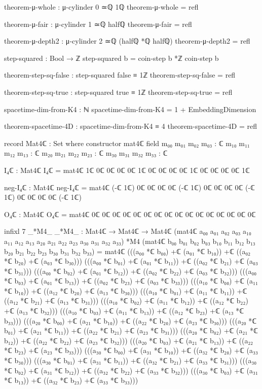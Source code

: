 \documentclass[11pt,a4paper]{book}
\begin{document}
\begin{code}
theorem-μ-whole : μ-cylinder 0 ≃ℚ 1ℚ
theorem-μ-whole = refl

theorem-μ-fair : μ-cylinder 1 ≃ℚ halfℚ
theorem-μ-fair = refl

theorem-μ-depth2 : μ-cylinder 2 ≃ℚ (halfℚ *ℚ halfℚ)
theorem-μ-depth2 = refl

step-squared : Bool → ℤ
step-squared b = coin-step b *ℤ coin-step b

theorem-step-sq-false : step-squared false ≡ 1ℤ
theorem-step-sq-false = refl

theorem-step-sq-true : step-squared true ≡ 1ℤ
theorem-step-sq-true = refl

spacetime-dim-from-K4 : ℕ
spacetime-dim-from-K4 = 1 + EmbeddingDimension

theorem-spacetime-4D : spacetime-dim-from-K4 ≡ 4
theorem-spacetime-4D = refl

record Mat4ℂ : Set where
  constructor mat4ℂ
  field
    m₀₀ m₀₁ m₀₂ m₀₃ : ℂ
    m₁₀ m₁₁ m₁₂ m₁₃ : ℂ
    m₂₀ m₂₁ m₂₂ m₂₃ : ℂ
    m₃₀ m₃₁ m₃₂ m₃₃ : ℂ

I₄ℂ : Mat4ℂ
I₄ℂ = mat4ℂ 1ℂ 0ℂ 0ℂ 0ℂ  0ℂ 1ℂ 0ℂ 0ℂ  0ℂ 0ℂ 1ℂ 0ℂ  0ℂ 0ℂ 0ℂ 1ℂ

neg-I₄ℂ : Mat4ℂ
neg-I₄ℂ = mat4ℂ (-ℂ 1ℂ) 0ℂ 0ℂ 0ℂ  0ℂ (-ℂ 1ℂ) 0ℂ 0ℂ
                 0ℂ 0ℂ (-ℂ 1ℂ) 0ℂ  0ℂ 0ℂ 0ℂ (-ℂ 1ℂ)

O₄ℂ : Mat4ℂ
O₄ℂ = mat4ℂ 0ℂ 0ℂ 0ℂ 0ℂ  0ℂ 0ℂ 0ℂ 0ℂ  0ℂ 0ℂ 0ℂ 0ℂ  0ℂ 0ℂ 0ℂ 0ℂ

infixl 7 _*M4_
_*M4_ : Mat4ℂ → Mat4ℂ → Mat4ℂ
(mat4ℂ a₀₀ a₀₁ a₀₂ a₀₃ a₁₀ a₁₁ a₁₂ a₁₃
       a₂₀ a₂₁ a₂₂ a₂₃ a₃₀ a₃₁ a₃₂ a₃₃) *M4
 (mat4ℂ b₀₀ b₀₁ b₀₂ b₀₃ b₁₀ b₁₁ b₁₂ b₁₃
        b₂₀ b₂₁ b₂₂ b₂₃ b₃₀ b₃₁ b₃₂ b₃₃) =
  mat4ℂ
   (((a₀₀ *ℂ b₀₀) +ℂ (a₀₁ *ℂ b₁₀)) +ℂ ((a₀₂ *ℂ b₂₀) +ℂ (a₀₃ *ℂ b₃₀)))
   (((a₀₀ *ℂ b₀₁) +ℂ (a₀₁ *ℂ b₁₁)) +ℂ ((a₀₂ *ℂ b₂₁) +ℂ (a₀₃ *ℂ b₃₁)))
   (((a₀₀ *ℂ b₀₂) +ℂ (a₀₁ *ℂ b₁₂)) +ℂ ((a₀₂ *ℂ b₂₂) +ℂ (a₀₃ *ℂ b₃₂)))
   (((a₀₀ *ℂ b₀₃) +ℂ (a₀₁ *ℂ b₁₃)) +ℂ ((a₀₂ *ℂ b₂₃) +ℂ (a₀₃ *ℂ b₃₃)))
   (((a₁₀ *ℂ b₀₀) +ℂ (a₁₁ *ℂ b₁₀)) +ℂ ((a₁₂ *ℂ b₂₀) +ℂ (a₁₃ *ℂ b₃₀)))
   (((a₁₀ *ℂ b₀₁) +ℂ (a₁₁ *ℂ b₁₁)) +ℂ ((a₁₂ *ℂ b₂₁) +ℂ (a₁₃ *ℂ b₃₁)))
   (((a₁₀ *ℂ b₀₂) +ℂ (a₁₁ *ℂ b₁₂)) +ℂ ((a₁₂ *ℂ b₂₂) +ℂ (a₁₃ *ℂ b₃₂)))
   (((a₁₀ *ℂ b₀₃) +ℂ (a₁₁ *ℂ b₁₃)) +ℂ ((a₁₂ *ℂ b₂₃) +ℂ (a₁₃ *ℂ b₃₃)))
   (((a₂₀ *ℂ b₀₀) +ℂ (a₂₁ *ℂ b₁₀)) +ℂ ((a₂₂ *ℂ b₂₀) +ℂ (a₂₃ *ℂ b₃₀)))
   (((a₂₀ *ℂ b₀₁) +ℂ (a₂₁ *ℂ b₁₁)) +ℂ ((a₂₂ *ℂ b₂₁) +ℂ (a₂₃ *ℂ b₃₁)))
   (((a₂₀ *ℂ b₀₂) +ℂ (a₂₁ *ℂ b₁₂)) +ℂ ((a₂₂ *ℂ b₂₂) +ℂ (a₂₃ *ℂ b₃₂)))
   (((a₂₀ *ℂ b₀₃) +ℂ (a₂₁ *ℂ b₁₃)) +ℂ ((a₂₂ *ℂ b₂₃) +ℂ (a₂₃ *ℂ b₃₃)))
   (((a₃₀ *ℂ b₀₀) +ℂ (a₃₁ *ℂ b₁₀)) +ℂ ((a₃₂ *ℂ b₂₀) +ℂ (a₃₃ *ℂ b₃₀)))
   (((a₃₀ *ℂ b₀₁) +ℂ (a₃₁ *ℂ b₁₁)) +ℂ ((a₃₂ *ℂ b₂₁) +ℂ (a₃₃ *ℂ b₃₁)))
   (((a₃₀ *ℂ b₀₂) +ℂ (a₃₁ *ℂ b₁₂)) +ℂ ((a₃₂ *ℂ b₂₂) +ℂ (a₃₃ *ℂ b₃₂)))
   (((a₃₀ *ℂ b₀₃) +ℂ (a₃₁ *ℂ b₁₃)) +ℂ ((a₃₂ *ℂ b₂₃) +ℂ (a₃₃ *ℂ b₃₃)))


\end{code}
\end{document}
